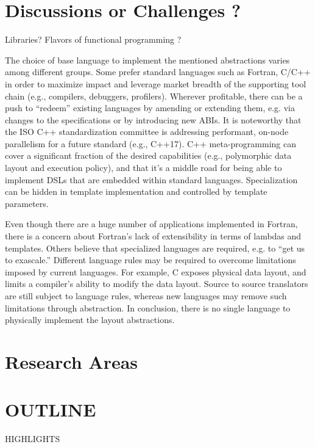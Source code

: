 \section{Discussions or Challenges ?}

Libraries? 
Flavors of functional programming ?

The choice of base language to implement the mentioned abstractions varies among different groups. 
Some prefer standard languages such as Fortran, C/C++ in order to maximize impact and leverage market breadth of the supporting tool chain (e.g., compilers, debuggers, profilers). Wherever profitable, there can be a push to ``redeem'' existing languages by amending or extending them, e.g. via changes to the specifications or by introducing new ABIs. It is noteworthy that the ISO C++ standardization committee is addressing performant, on-node parallelism for a future standard (e.g., C++17).
C++ meta-programming can cover a significant fraction of the desired capabilities (e.g., polymorphic data layout and execution policy), and that it's a middle road for being able to implement DSLs that are embedded within standard languages. Specialization can be hidden in template implementation and controlled by template parameters. 

Even though there are a huge number of applications implemented in Fortran, 
there is a concern about Fortran's lack of extensibility in terms of lambdas and templates. Others believe that specialized languages are required, e.g. to ``get us to exascale.'' Different language rules may be required to overcome limitations imposed by current languages. For example, C exposes physical data layout, and limits a compiler's ability to modify the data layout. Source to source translators are still subject to language rules, whereas new languages may remove such limitations through abstraction.
In conclusion, there is no single language  to physically implement the layout abstractions.


\section{Research Areas}



\section{OUTLINE}

HIGHLIGHTS

